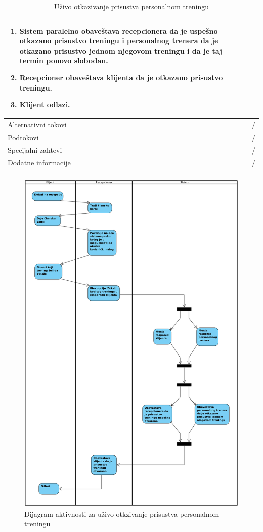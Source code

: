 \begin{longtable}{| p{} | p{} |}
\begin{enumerate}
    \item Sistem paralelno obaveštava recepcionera da je uspešno otkazano prisustvo treningu i personalnog trenera da je otkazano prisustvo jednom njegovom treningu i da je taj termin ponovo slobodan.
    \item Recepcioner obaveštava klijenta da je otkazano prisustvo treningu.
    \item Klijent odlazi.
   \end{enumerate}\\
\hline
    Alternativni tokovi & /\\
\hline
    Podtokovi & /\\
\hline
    Specijalni zahtevi & /\\
\hline
    Dodatne informacije & /\\
\hline
\caption{Uživo otkazivanje prisustva personalnom treningu}
\end{longtable}

\newpage
\begin{figure}[!ht]
\begin{center}
\includegraphics[scale=0.35]{sections/images/dijagram_aktivnosti_personalni_otkazivanje_uzivo.png}
\end{center}
\caption{Dijagram aktivnosti za uživo otkzivanje prisustva personalnom treningu}
\label{fig:kontekst}
\end{figure}




